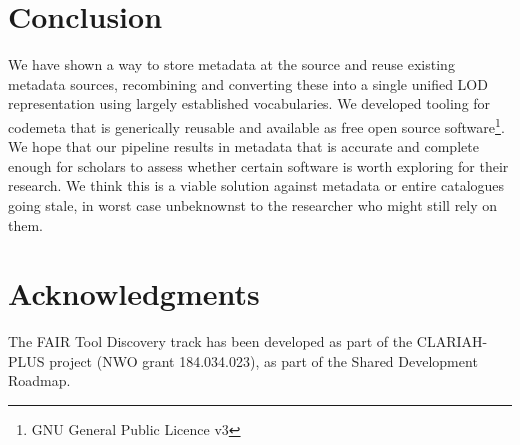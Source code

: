 \documentclass[a4paper,11pt]{article}
\begin{document}
\section{Conclusion}

We have shown a way to store metadata at the source and reuse existing metadata
sources, recombining and converting these into a single unified LOD
representation using largely established vocabularies. We developed tooling for
codemeta that is generically reusable and available as free open source
software\footnote{GNU General Public Licence v3}. We hope that our pipeline
results in metadata that is accurate and complete enough for scholars to assess
whether certain software is worth exploring for their research. We think this
is a viable solution against metadata or entire catalogues going stale, in
worst case unbeknownst to the researcher who might still rely on them.

\section*{Acknowledgments}

The FAIR Tool Discovery track has been developed as part of the CLARIAH-PLUS
project (NWO grant 184.034.023), as part of the Shared Development Roadmap.

\printbibliography
\end{document}
